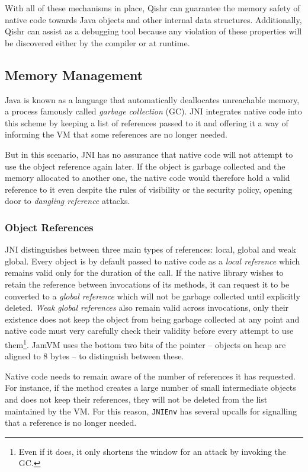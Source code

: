 \documentclass[a4paper,12pt,twoside,openright]{report}
\begin{document}
With all of these mechanisms in place, Qishr can guarantee the memory safety of native code towards Java objects and other internal data structures. Additionally, Qishr can assist as a debugging tool because any violation of these properties will be discovered either by the compiler or at runtime.

\subsection{Memory Management}

Java is known as a language that automatically deallocates unreachable memory, a process famously called \emph{garbage collection} (GC). JNI integrates native code into this scheme by keeping a list of references passed to it and offering it a way of informing the VM that some references are no longer needed. 

But in this scenario, JNI has no assurance that native code will not attempt to use the object reference again later. If the object is garbage collected and the memory allocated to another one, the native code would therefore hold a valid reference to it even despite the rules of visibility or the security policy, opening door to \emph{dangling reference} attacks.

\subsubsection{Object References}
\label{sec:LocalAndGlobalRefs}

JNI distinguishes between three main types of references: local, global and weak global. Every object is by default passed to native code as a \emph{local reference} which remains valid only for the duration of the call. If the native library wishes to retain the reference between invocations of its methods, it can request it to be converted to a \emph{global reference} which will not be garbage collected until explicitly deleted. \emph{Weak global references} also remain valid across invocations, only their existence does not keep the object from being garbage collected at any point and native code must very carefully check their validity before every attempt to use them\footnote{Even if it does, it only shortens the window for an attack by invoking the GC.}. JamVM uses the bottom two bits of the pointer -- objects on heap are aligned to 8 bytes -- to distinguish between these.

Native code needs to remain aware of the number of references it has requested. For instance, if the method creates a large number of small intermediate objects and does not keep their references, they will not be deleted from the list maintained by the VM. For this reason, \texttt{JNIEnv} has several upcalls for signalling that a reference is no longer needed. 
\end{document}
